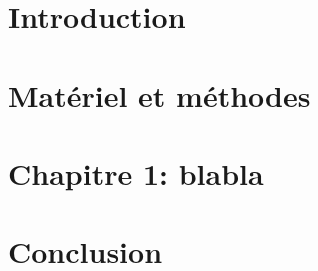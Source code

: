 \documentclass[12pt, 			%
               twoside,         %
			  ]{report}
\begin{document}






\tableofcontents

\listoffigures

\listoftables





\chapter[Introduction]{Introduction}


\chapter[Matériel et méthodes]{Matériel et méthodes}


\chapter[Chapitre 1: blabla]{Chapitre 1: blabla}


\chapter[Conclusion]{Conclusion}


\printbibliography


\end{document}
